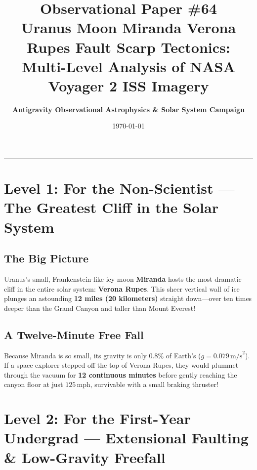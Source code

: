 \documentclass[11pt,a4paper]{article}
\title{\Huge \textbf{Observational Paper \#64}\\ \Large Uranus Moon Miranda Verona Rupes Fault Scarp Tectonics: Multi-Level Analysis of NASA Voyager 2 ISS Imagery}
\author{\textbf{Antigravity Observational Astrophysics \& Solar System Campaign}}
\date{\today}
\begin{document}
\maketitle

\vspace{-1em}
\begin{center}
\rule{\textwidth}{1.5pt}
\end{center}

\section*{Level 1: For the Non-Scientist — The Greatest Cliff in the Solar System}

\subsection*{The Big Picture}
Uranus's small, Frankenstein-like icy moon \textbf{Miranda} hosts the most dramatic cliff in the entire solar system: \textbf{Verona Rupes}. This sheer vertical wall of ice plunges an astounding \textbf{12 miles (20 kilometers)} straight down—over ten times deeper than the Grand Canyon and taller than Mount Everest!

\subsection*{A Twelve-Minute Free Fall}
Because Miranda is so small, its gravity is only $0.8\%$ of Earth's ($g = 0.079\,\text{m/s}^2$). If a space explorer stepped off the top of Verona Rupes, they would plummet through the vacuum for \textbf{12 continuous minutes} before gently reaching the canyon floor at just $125\,\text{mph}$, survivable with a small braking thruster!

\newpage

\section*{Level 2: For the First-Year Undergrad — Extensional Faulting \& Low-Gravity Freefall}
\end{document}
